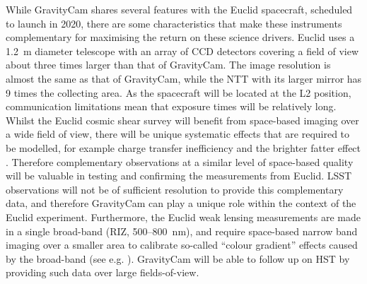\documentclass{pasa}%
\begin{document}

While \mbox{GravityCam} shares several features with the Euclid spacecraft, scheduled to launch in 2020, there are some characteristics that make these instruments complementary for maximising the return on these science drivers. Euclid uses a 1.2~m diameter telescope with an array of CCD detectors covering a field of view about three times
larger than that of \mbox{GravityCam}.  The image resolution is almost the same as that of \mbox{GravityCam}, while the NTT with its larger mirror has 9 times the collecting area.  As the spacecraft will be located at the L2 position, communication limitations mean that exposure times will be relatively long. Whilst the Euclid cosmic shear survey will benefit from space-based imaging over a wide field of view, there will be unique systematic effects that are required to be modelled, for example charge transfer inefficiency \citep{Holland+1990} and the brighter fatter effect \citep{Downing+2006}. Therefore complementary observations at a similar level of space-based quality will be valuable in testing and confirming the measurements from Euclid. LSST observations will not be of sufficient resolution to provide this complementary data, and therefore GravityCam can play a unique role within the context of the Euclid experiment.
Furthermore, the Euclid weak lensing measurements are made in a single broad-band (RIZ, 500--800~nm), and require space-based narrow band imaging over a smaller area to calibrate so-called ``colour gradient'' effects caused by the broad-band (see e.g. \citealt{Semboloni+2013}). \mbox{GravityCam} will be able to follow up on HST by providing such data over large fields-of-view. 
\end{document}
